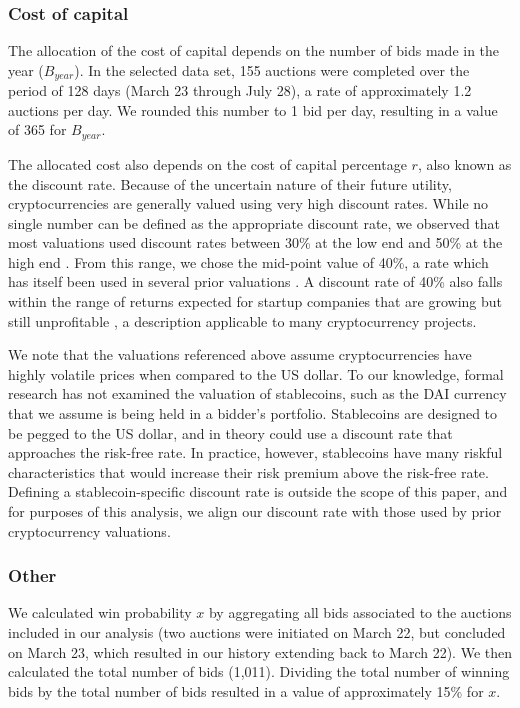 \documentclass[conference]{IEEEtran}
\begin{document}
\subsubsection{Cost of capital}
The allocation of the cost of capital depends on the number of bids made in the year ($B_{year}$). In the selected data set, 155 auctions were completed over the period of 128 days (March 23 through July 28), a rate of approximately 1.2 auctions per day. We rounded this number to 1 bid per day, resulting in a value of 365 for $B_{year}$. 

The allocated cost also depends on the cost of capital percentage $r$, also known as the discount rate. Because of the uncertain nature of their future utility, cryptocurrencies are generally valued using very high discount rates. While no single number can be defined as the appropriate discount rate, we observed that most valuations used discount rates between 30\% at the low end \cite{valuation1} and 50\% at the high end \cite{valuation2}. From this range, we chose the mid-point value of 40\%, a rate which has itself been used in several prior valuations \cite{valuation3, valuation4}. A discount rate of 40\% also falls within the range of returns expected for startup companies that are growing but still unprofitable \cite{valuation5}, a description applicable to many cryptocurrency projects.

We note that the valuations referenced above assume cryptocurrencies have highly volatile prices when compared to the US dollar. To our knowledge, formal research has not examined the valuation of stablecoins, such as the DAI currency that we assume is being held in a bidder's portfolio. Stablecoins are designed to be pegged to the US dollar, and in theory could use a discount rate that approaches the risk-free rate. In practice, however, stablecoins have many riskful characteristics that would increase their risk premium above the risk-free rate. Defining a stablecoin-specific discount rate is outside the scope of this paper, and for purposes of this analysis, we align our discount rate with those used by prior cryptocurrency valuations.

\subsubsection{Other} We calculated win probability $x$ by aggregating all bids associated to the auctions included in our analysis (two auctions were initiated on March 22, but concluded on March 23, which resulted in our history extending back to March 22). We then calculated the total number of bids (1,011). Dividing the total number of winning bids by the total number of bids resulted in a value of approximately 15\% for $x$.
\end{document}

